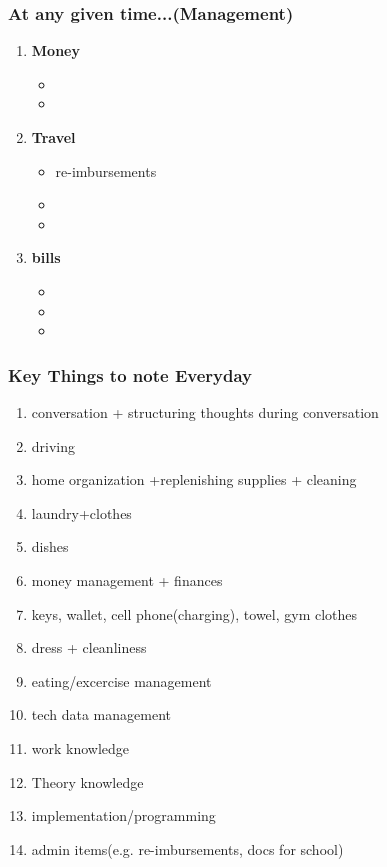 \begin{frame}
\frametitle{At any given time...(Management)}
\begin{enumerate}
\item \small \textbf{Money}
\begin{itemize} 
\item \tiny 
\item \tiny
\end{itemize} 
\item \small \textbf{Travel}
\begin{itemize} 
\item \tiny re-imbursements
\item \tiny 
\item \tiny 
\end{itemize} 
\item \small \textbf{bills} 
\begin{itemize} 
\item \tiny 
\item \tiny 
\item \tiny 
\end{itemize} 
\end{enumerate}
\end{frame}   

\begin{frame} 
\frametitle{Key Things to note Everyday}
\begin{enumerate}
\item \tiny conversation + structuring thoughts during conversation
\item \tiny driving
\item \tiny home organization +replenishing supplies + cleaning 
\item \tiny laundry+clothes  
\item \tiny dishes 
\item \tiny money management + finances 
\item \tiny keys, wallet, cell phone(charging), towel, gym clothes 
\item \tiny dress + cleanliness 
\item \tiny eating/excercise management 
\item \tiny tech data management 
\item \tiny work knowledge
\item \tiny Theory knowledge
\item \tiny implementation/programming
\item \tiny admin items(e.g. re-imbursements, docs for school)
\end{enumerate}
\end{frame}
